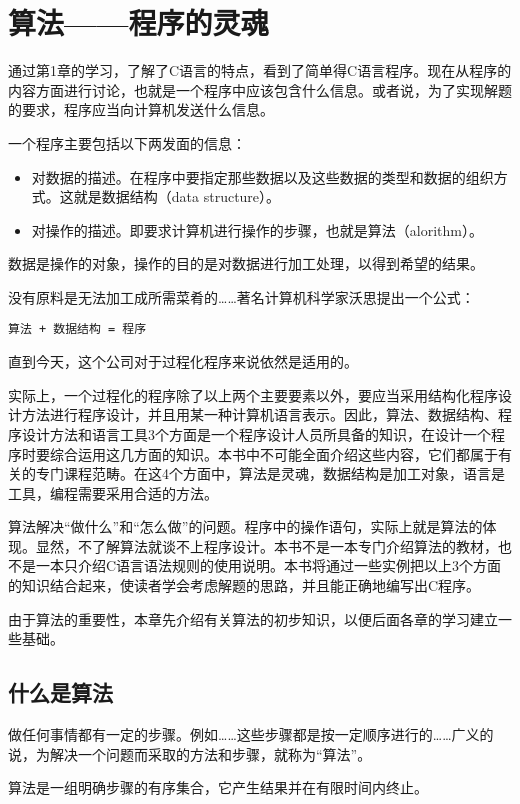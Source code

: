 \chapter{算法——程序的灵魂}
通过第1章的学习，了解了C语言的特点，看到了简单得C语言程序。现在从程序的内容方面进行讨论，也就是一个程序中应该包含什么信息。或者说，为了实现解题的要求，程序应当向计算机发送什么信息。

一个程序主要包括以下两发面的信息：
\begin{itemize}
	\item 对数据的描述。在程序中要指定那些数据以及这些数据的类型和数据的组织方式。这就是数据结构（data structure）。
	\item 对操作的描述。即要求计算机进行操作的步骤，也就是算法（alorithm）。
\end{itemize}

数据是操作的对象，操作的目的是对数据进行加工处理，以得到希望的结果。

没有原料是无法加工成所需菜肴的……著名计算机科学家沃思提出一个公式：
\begin{lstlisting}
算法 + 数据结构 = 程序
\end{lstlisting}

直到今天，这个公司对于过程化程序来说依然是适用的。

实际上，一个过程化的程序除了以上两个主要要素以外，要应当采用结构化程序设计方法进行程序设计，并且用某一种计算机语言表示。因此，算法、数据结构、程序设计方法和语言工具3个方面是一个程序设计人员所具备的知识，在设计一个程序时要综合运用这几方面的知识。本书中不可能全面介绍这些内容，它们都属于有关的专门课程范畴。在这4个方面中，算法是灵魂，数据结构是加工对象，语言是工具，编程需要采用合适的方法。

算法解决“做什么”和“怎么做”的问题。程序中的操作语句，实际上就是算法的体现。显然，不了解算法就谈不上程序设计。本书不是一本专门介绍算法的教材，也不是一本只介绍C语言语法规则的使用说明。本书将通过一些实例把以上3个方面的知识结合起来，使读者学会考虑解题的思路，并且能正确地编写出C程序。

由于算法的重要性，本章先介绍有关算法的初步知识，以便后面各章的学习建立一些基础。

\section{什么是算法}
做任何事情都有一定的步骤。例如……这些步骤都是按一定顺序进行的……广义的说，为解决一个问题而采取的方法和步骤，就称为“算法”。

算法是一组明确步骤的有序集合，它产生结果并在有限时间内终止。

